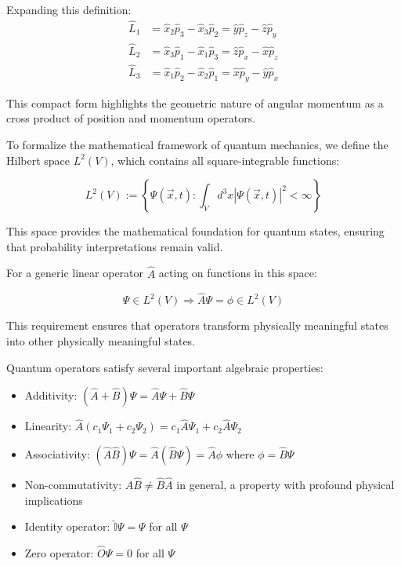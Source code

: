 Expanding this definition:
\begin{align}
\hat{L}_1 &= \hat{x}_2\hat{p}_3 - \hat{x}_3\hat{p}_2 = \hat{y}\hat{p}_z - \hat{z}\hat{p}_y \\
\hat{L}_2 &= \hat{x}_3\hat{p}_1 - \hat{x}_1\hat{p}_3 = \hat{z}\hat{p}_x - \hat{x}\hat{p}_z \\
\hat{L}_3 &= \hat{x}_1\hat{p}_2 - \hat{x}_2\hat{p}_1 = \hat{x}\hat{p}_y - \hat{y}\hat{p}_x
\end{align}

This compact form highlights the geometric nature of angular momentum as a cross product of position and momentum operators.

To formalize the mathematical framework of quantum mechanics, we define the Hilbert space $L^{2}(V)$, which contains all square-integrable functions:

\begin{equation}
L^{2}(V) := \left\{\Psi(\vec{x},t) : \int_{V} d^{3}x |\Psi(\vec{x},t)|^{2} < \infty \right\} \label{eq:1.50}
\end{equation}

This space provides the mathematical foundation for quantum states, ensuring that probability interpretations remain valid.

For a generic linear operator $\hat{A}$ acting on functions in this space:

\begin{equation}
\Psi \in L^{2}(V) \Rightarrow \hat{A}\Psi = \phi \in L^{2}(V)
\end{equation}

This requirement ensures that operators transform physically meaningful states into other physically meaningful states.

Quantum operators satisfy several important algebraic properties:

\begin{itemize}
  \item Additivity: $(\hat{A}+\hat{B})\Psi = \hat{A}\Psi + \hat{B}\Psi$
  \item Linearity: $\hat{A}(c_{1}\Psi_{1} + c_{2}\Psi_{2}) = c_{1}\hat{A}\Psi_{1} + c_{2}\hat{A}\Psi_{2}$
  \item Associativity: $(\hat{A}\hat{B})\Psi = \hat{A}(\hat{B}\Psi) = \hat{A}\phi$ where $\phi = \hat{B}\Psi$
  \item Non-commutativity: $\hat{A}\hat{B} \neq \hat{B}\hat{A}$ in general, a property with profound physical implications
  \item Identity operator: $\hat{\mathbb{I}}\Psi = \Psi$ for all $\Psi$
  \item Zero operator: $\hat{O}\Psi = 0$ for all $\Psi$
\end{itemize}

